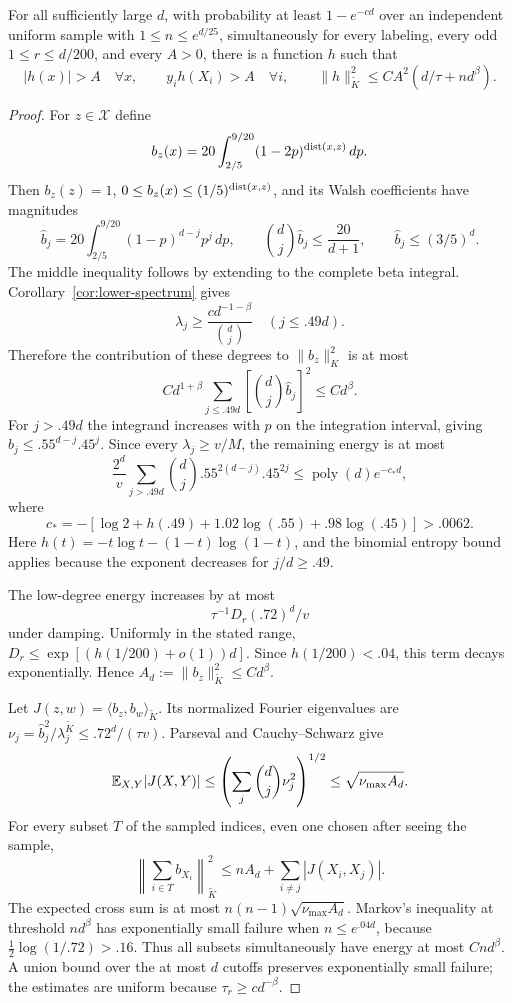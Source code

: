 \begin{lemma}\label{lem:zero-bump}
For all sufficiently large $d$, with probability at least $1-e^{-cd}$ over an independent uniform sample with $1\le n\le e^{d/25}$, simultaneously for every labeling, every odd $1\le r\le d/200$, and every $A>0$, there is a function $h$ such that
\[
 |h(x)|>A\quad\forall x,\qquad y_i h(X_i)>A\quad\forall i,
 \qquad \|h\|_{\widetilde K}^2\le C A^2(d/\tau+nd^\beta).
\]
\end{lemma}
\begin{proof}
For $z\in\mathcal X$ define
\[
 b_z(x)=20\int_{2/5}^{9/20}(1-2p)^{\operatorname{dist}(x,z)}\,dp.
\]
Then $b_z(z)=1$, $0\le b_z(x)\le(1/5)^{\operatorname{dist}(x,z)}$, and its Walsh coefficients have magnitudes
\[
 \widehat b_j=20\int_{2/5}^{9/20}(1-p)^{d-j}p^j\,dp,
 \qquad \binom dj\widehat b_j\le\frac{20}{d+1},\qquad \widehat b_j\le(3/5)^d.
\]
The middle inequality follows by extending to the complete beta integral. Corollary~\ref{cor:lower-spectrum} gives
\[
 \lambda_j\ge\frac{c d^{-1-\beta}}{\binom dj}\quad(j\le .49d).
\]
Therefore the contribution of these degrees to $\|b_z\|_K^2$ is at most
\[
 C d^{1+\beta}\sum_{j\le .49d}\left[\binom dj\widehat b_j\right]^2\le C d^\beta.
\]
For $j>.49d$ the integrand increases with $p$ on the integration interval, giving $\widehat b_j\le .55^{d-j}.45^j$. Since every $\lambda_j\ge v/M$, the remaining energy is at most
\[
 \frac{2^d}{v}\sum_{j>.49d}\binom dj .55^{2(d-j)}.45^{2j}\le \operatorname{poly}(d)e^{-c_*d},
\]
where
\[
 c_*=-[\log2+h(.49)+1.02\log(.55)+.98\log(.45)]>.0062.
\]
Here $h(t)=-t\log t-(1-t)\log(1-t)$, and the binomial entropy bound applies because the exponent decreases for $j/d\ge .49$.

The low-degree energy increases by at most
\[
 \tau^{-1}D_r( .72)^d/v
\]
under damping. Uniformly in the stated range, $D_r\le\exp[(h(1/200)+o(1))d]$. Since $h(1/200)<.04$, this term decays exponentially. Hence $A_d:=\|b_z\|_{\widetilde K}^2\le Cd^\beta$.

Let $J(z,w)=\langle b_z,b_w\rangle_{\widetilde K}$. Its normalized Fourier eigenvalues are $\nu_j=\widehat b_j^2/\lambda^{\widetilde K}_j\le .72^d/(\tau v)$. Parseval and Cauchy--Schwarz give
\[
 \mathbb E_{X,Y}|J(X,Y)|\le\left(\sum_j\binom dj\nu_j^2\right)^{1/2}
 \le\sqrt{\nu_{\max} A_d}.
\]
For every subset $T$ of the sampled indices, even one chosen after seeing the sample,
\[
 \left\|\sum_{i\in T}b_{X_i}\right\|_{\widetilde K}^2
 \le nA_d+\sum_{i\ne j}|J(X_i,X_j)|.
\]
The expected cross sum is at most $n(n-1)\sqrt{\nu_{\max}A_d}$. Markov's inequality at threshold $nd^\beta$ has exponentially small failure when $n\le e^{.04d}$, because $\tfrac12\log(1/.72)>.16$. Thus all subsets simultaneously have energy at most $Cnd^\beta$. A union bound over the at most $d$ cutoffs preserves exponentially small failure; the estimates are uniform because $\tau_r\ge c d^{-\beta}$.


\end{proof}
